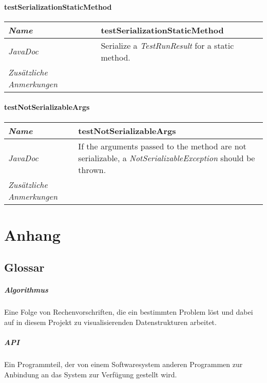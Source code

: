 \documentclass[a4paper]{report}
\begin{document}
\subsubsection{testSerializationStaticMethod}
\begin{tabular}{p{2.3cm}  p{11.5cm}}
  \hline
 \textit{Name} & testSerializationStaticMethod\\
  \hline
 \textit{JavaDoc} & Serialize a \emph{TestRunResult} for a static method. \\
  \hline
 \textit{Zusätzliche Anmerkungen} & \\
  \hline
\end{tabular}

\subsubsection{testNotSerializableArgs}
\begin{tabular}{p{2.3cm}  p{11.5cm}}
  \hline
 \textit{Name} & testNotSerializableArgs\\
  \hline
 \textit{JavaDoc} & If the arguments passed to the method are not serializable, a \emph{NotSerializableException} should be thrown. \\
  \hline
 \textit{Zusätzliche Anmerkungen} & \\
  \hline
\end{tabular}
\renewcommand{\arraystretch}{1}
\chapter{Anhang}

\section{Glossar}

\paragraph{Algorithmus} Eine Folge von Rechenvorschriften, die ein bestimmten Problem löst und dabei auf in diesem Projekt zu visualisierenden Datenstrukturen arbeitet.

\paragraph{API} Ein Programmteil, der von einem Softwaresystem anderen Programmen zur Anbindung an das System zur Verfügung gestellt wird.
\end{document}
